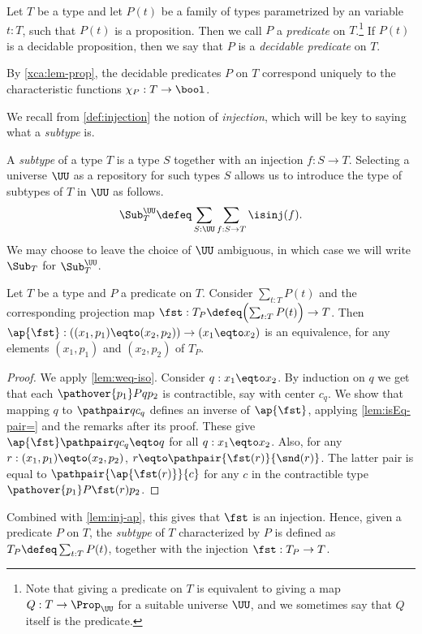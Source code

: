 \begin{definition}\label{def:predicate}
  Let $T$ be a type and let $P(t)$ be a family of types parametrized by an variable $t:T$, such that $P(t)$ is a proposition.
  Then we call $P$ a \emph{predicate} on $T$.\footnote{%
    Note that giving a predicate on $T$ is
    equivalent to giving a map $Q: T\to\Prop_\UU$ for a suitable universe $\UU$,
    and we sometimes say that $Q$ itself is the predicate.}
  If $P(t)$ is a decidable proposition,
  then we say that $P$ is a \emph{decidable predicate} on $T$.
\end{definition}

By \cref{xca:lem-prop}, the decidable predicates $P$ on $T$
correspond uniquely to the characteristic functions $\chi_P:T\to\bool$.

We recall from \cref{def:injection} the notion of \emph{injection}, 
which will be key to saying what a \emph{subtype} is.


\begin{definition}\label{def:subtype}
  A \emph{subtype} of a type $T$
  is a type $S$ together with an injection
  $f : S \to T$.  Selecting a universe $\UU$ as a repository for such types $S$ allows us to introduce
  the type of subtypes of $T$ in $\UU$ as follows.
  \[
  \Sub^\UU_T \defeq \sum_{S:\UU}\sum_{f:S\to T}\isinj(f).
  \]
  We may choose to leave the choice of $\UU$ ambiguous, in which case we will write $\Sub_T$ for $\Sub^\UU_T$.
\end{definition}

\begin{lemma}\label{lem:subtype-eq-=}
  Let $T$ be a type and $P$ a predicate on $T$.
  Consider $\sum_{t:T}P(t)$ and the corresponding projection map
  $\fst : T_P \defeq \Bigl(\sum_{t:T}P(t)\Bigr) \to T$.
  Then $\ap{\fst}: ((x_1,p_1) \eqto (x_2,p_2)) \to (x_1 \eqto x_2)$ is an equivalence,
  for any elements $(x_1,p_1)$ and $(x_2,p_2)$ of $T_P$.
\end{lemma}

\begin{proof}
We apply \cref{lem:weq-iso}. Consider $q: x_1 \eqto x_2$.
By induction on $q$ we get that each $\pathover {p_1} P q {p_2}$ is contractible,
say with center $c_q$. We show that
mapping $q$ to $\pathpair q {c_q}$ defines an inverse of $\ap{\fst}$,
applying \cref{lem:isEq-pair=} and the remarks after its proof.
These give $\ap{\fst}\pathpair q {c_q} \eqto q$ for all $q: x_1 \eqto x_2$.
Also, for any $r: (x_1,p_1) \eqto (x_2,p_2)$, $r \eqto \pathpair{\fst(r)}{\snd(r)}$.
The latter pair is equal to $\pathpair{\ap{\fst(r)}}{c}$ for any $c$
in the contractible type $\pathover {p_1} P {\fst(r)} {p_2}$.
\end{proof}
Combined with \cref{lem:inj-ap},
this gives that $\fst$ is an injection.
Hence, given a predicate $P$ on $T$,
the \emph{subtype} of $T$ characterized by $P$ is defined
as $T_P\defeq \sum_{t:T} P(t)$,
together with the injection $\fst : T_P \to T$.


